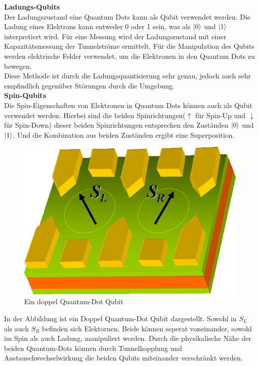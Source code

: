 \textbf{Ladungs-Qubits}\\
Der Ladungszustand eine Quantum Dots kann als Qubit verwendet werden. Die Ladung eines Elektrons kann entweder 0 oder 1 sein, was als $\ket{0}$ und $\ket{1}$ interpretiert wird.
Für eine Messung wird der Ladungszustand mit einer Kapazitätsmessung der Tunnelströme ermittelt.
Für die Manipulation des Qubits werden elektrische Felder verwendet, um die Elektronen in den Quantum Dots zu bewegen.\\

Diese Methode ist durch die Ladungsquantisierung sehr genau, jedoch auch sehr empfindlich gegenüber Störungen durch die Umgebung.\\

\textbf{Spin-Qubits}\\
Die Spin-Eigenschaften von Elektronen in Quantum Dots können auch als Qubit verwendet werden. Hierbei sind die beiden Spinrichtungen($\uparrow$ für Spin-Up und $\downarrow$ für Spin-Down)
dieser beiden Spinrichtungen entsprechen den Zuständen $\ket{0}$ und $\ket{1}$. Und die Kombination aus beiden Zuständen ergibt eine Superposition.\\

\begin{figure}[H]
    \centering
    \includegraphics[width=0.75\linewidth]{img/QD.png}
    \caption{Ein doppel Quantum-Dot Qubit}
    \label{fig:double-Quantum-Dot}
\end{figure}

In der Abbildung ist ein Doppel Quantum-Dot Qubit dargestellt. Sowohl in $S_L$ als auch $S_R$ befinden sich Elektornen. Beide können seperat voneinander, sowohl im Spin als auch Ladung, manipuliert werden.
Durch die physikalische Nähe der beiden Quantum-Dots können durch Tunnelkopplung und Austauschwechselwirkung die beiden Qubits miteinander verschränkt werden.\\

